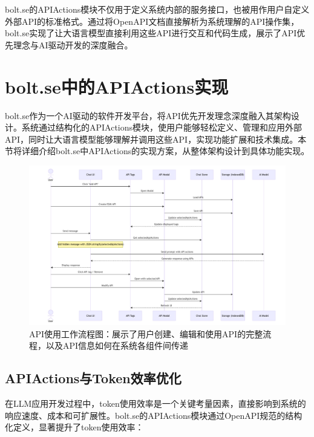 bolt.se的APIActions模块不仅用于定义系统内部的服务接口，也被用作用户自定义外部API的标准格式。通过将OpenAPI文档直接解析为系统理解的API操作集，bolt.se实现了让大语言模型直接利用这些API进行交互和代码生成，展示了API优先理念与AI驱动开发的深度融合。

\section{bolt.se中的APIActions实现}
bolt.se作为一个AI驱动的软件开发平台，将API优先开发理念深度融入其架构设计。系统通过结构化的APIActions模块，使用户能够轻松定义、管理和应用外部API，同时让大语言模型能够理解并调用这些API，实现功能扩展和技术集成。本节将详细介绍bolt.se中APIActions的实现方案，从整体架构设计到具体功能实现。

\begin{figure}[htbp]
  \centering
  \includegraphics[width=\textwidth]{figures/api_workflow.pdf}
  \caption{API使用工作流程图：展示了用户创建、编辑和使用API的完整流程，以及API信息如何在系统各组件间传递}
  \label{fig:api_workflow}
\end{figure}

\subsection{APIActions与Token效率优化}
在LLM应用开发过程中，token使用效率是一个关键考量因素，直接影响到系统的响应速度、成本和可扩展性。bolt.se的APIActions模块通过OpenAPI规范的结构化定义，显著提升了token使用效率：

